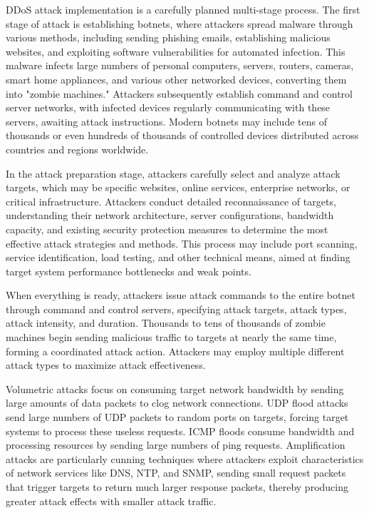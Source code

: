 \documentclass[12pt,a4paper]{article}
\begin{document}
DDoS attack implementation is a carefully planned multi-stage process. The first stage of attack is establishing botnets, where attackers spread malware through various methods, including sending phishing emails, establishing malicious websites, and exploiting software vulnerabilities for automated infection. This malware infects large numbers of personal computers, servers, routers, cameras, smart home appliances, and various other networked devices, converting them into "zombie machines." Attackers subsequently establish command and control server networks, with infected devices regularly communicating with these servers, awaiting attack instructions. Modern botnets may include tens of thousands or even hundreds of thousands of controlled devices distributed across countries and regions worldwide.

In the attack preparation stage, attackers carefully select and analyze attack targets, which may be specific websites, online services, enterprise networks, or critical infrastructure. Attackers conduct detailed reconnaissance of targets, understanding their network architecture, server configurations, bandwidth capacity, and existing security protection measures to determine the most effective attack strategies and methods. This process may include port scanning, service identification, load testing, and other technical means, aimed at finding target system performance bottlenecks and weak points.

When everything is ready, attackers issue attack commands to the entire botnet through command and control servers, specifying attack targets, attack types, attack intensity, and duration. Thousands to tens of thousands of zombie machines begin sending malicious traffic to targets at nearly the same time, forming a coordinated attack action. Attackers may employ multiple different attack types to maximize attack effectiveness.

Volumetric attacks focus on consuming target network bandwidth by sending large amounts of data packets to clog network connections. UDP flood attacks send large numbers of UDP packets to random ports on targets, forcing target systems to process these useless requests. ICMP floods consume bandwidth and processing resources by sending large numbers of ping requests. Amplification attacks are particularly cunning techniques where attackers exploit characteristics of network services like DNS, NTP, and SNMP, sending small request packets that trigger targets to return much larger response packets, thereby producing greater attack effects with smaller attack traffic.
\end{document}
